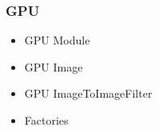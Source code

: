 


\begin{frame}
\frametitle{GPU}
\Huge
\begin{itemize}
\item GPU Module
\pause
\item GPU Image
\pause
\item GPU ImageToImageFilter
\pause
\item Factories
\end{itemize}
\end{frame}

